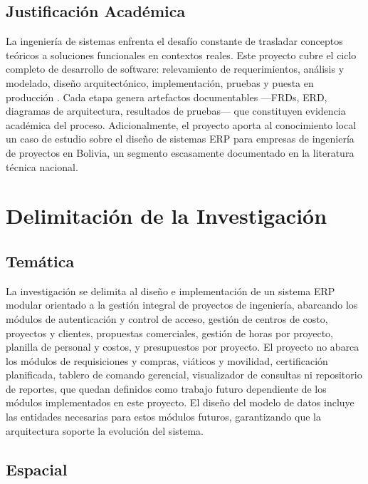 \documentclass{univalle-perfil}
\begin{document}
\subsection{Justificación Académica}

La ingeniería de sistemas enfrenta el desafío constante de trasladar conceptos teóricos a soluciones funcionales en contextos reales. Este proyecto cubre el ciclo completo de desarrollo de software: relevamiento de requerimientos, análisis y modelado, diseño arquitectónico, implementación, pruebas y puesta en producción \parencite{sommerville2015}. Cada etapa genera artefactos documentables —FRDs, ERD, diagramas de arquitectura, resultados de pruebas— que constituyen evidencia académica del proceso. Adicionalmente, el proyecto aporta al conocimiento local un caso de estudio sobre el diseño de sistemas ERP para empresas de ingeniería de proyectos en Bolivia, un segmento escasamente documentado en la literatura técnica nacional.

\section{Delimitación de la Investigación}

\subsection{Temática}

La investigación se delimita al diseño e implementación de un sistema ERP modular orientado a la gestión integral de proyectos de ingeniería, abarcando los módulos de autenticación y control de acceso, gestión de centros de costo, proyectos y clientes, propuestas comerciales, gestión de horas por proyecto, planilla de personal y costos, y presupuestos por proyecto. El proyecto no abarca los módulos de requisiciones y compras, viáticos y movilidad, certificación planificada, tablero de comando gerencial, visualizador de consultas ni repositorio de reportes, que quedan definidos como trabajo futuro dependiente de los módulos implementados en este proyecto. El diseño del modelo de datos incluye las entidades necesarias para estos módulos futuros, garantizando que la arquitectura soporte la evolución del sistema.

\subsection{Espacial}
\end{document}
